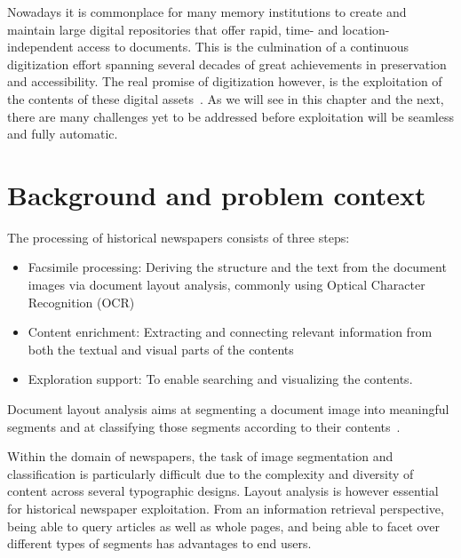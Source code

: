 \documentclass[english, bibtex]{kththesis}
\begin{document}
Nowadays it is commonplace for many memory institutions to create and maintain large digital repositories that offer rapid, time- and location-independent access to documents. This is the culmination of a continuous digitization effort spanning several decades of great achievements in preservation and accessibility. The real promise of digitization however, is the exploitation of the contents of these digital assets~\cite{jdmdh:7097}. As we will see in this chapter and the next, there are many challenges yet to be addressed before exploitation will be seamless and fully automatic. 

\section{Background and problem context}
\label{sec:background}

The processing of historical newspapers consists of three steps: 
\begin{itemize}
\item Facsimile processing: Deriving the structure and the text from the document images via document layout analysis, commonly using Optical Character Recognition (\gls{OCR})
\item Content enrichment: Extracting and connecting relevant information from both the textual and visual parts of the contents
\item Exploration support: To enable searching and visualizing the contents.  
\end{itemize}

Document layout analysis aims at segmenting a document image into meaningful segments and at classifying those segments according to their contents~\cite{ESKENAZI20171}. 
    
Within the domain of newspapers, the task of image segmentation and classification is particularly difficult due to the complexity and diversity of content across several typographic designs. Layout analysis is however essential for historical newspaper exploitation. From an information retrieval perspective, being able to query articles as well as whole pages, and being able to facet over different types of segments has advantages to end users. 

\end{document}
